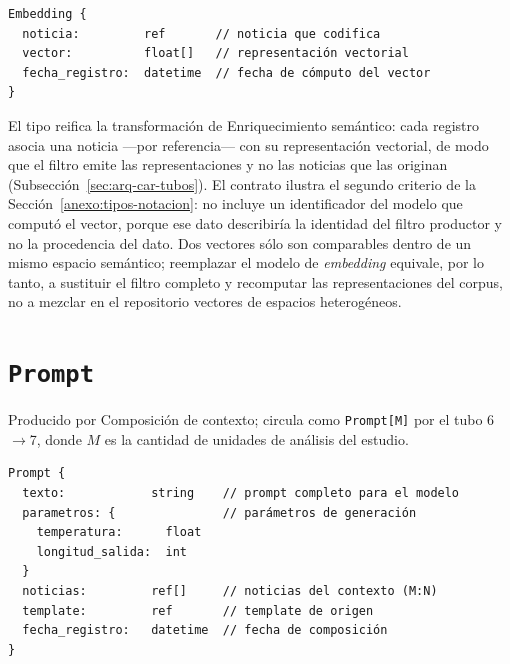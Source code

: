 \documentclass[12pt]{report}
\begin{document}
\noindent\begin{minipage}{\linewidth}
  \begin{lstlisting}[style=tipoanexo]
Embedding {
  noticia:         ref       // noticia que codifica
  vector:          float[]   // representación vectorial
  fecha_registro:  datetime  // fecha de cómputo del vector
}
\end{lstlisting}
\end{minipage}

El tipo reifica la transformación de Enriquecimiento semántico: cada registro asocia una noticia ---por referencia--- con su representación vectorial, de modo que el filtro emite las representaciones y no las noticias que las originan (Subsección~\ref{sec:arq-car-tubos}). El contrato ilustra el segundo criterio de la Sección~\ref{anexo:tipos-notacion}: no incluye un identificador del modelo que computó el vector, porque ese dato describiría la identidad del filtro productor y no la procedencia del dato. Dos vectores sólo son comparables dentro de un mismo espacio semántico; reemplazar el modelo de \textit{embedding} equivale, por lo tanto, a sustituir el filtro completo y recomputar las representaciones del corpus, no a mezclar en el repositorio vectores de espacios heterogéneos.

\section{\texorpdfstring{\texttt{Prompt}}{Prompt}}
\label{anexo:tipo-prompt}

Producido por Composición de contexto; circula como \texttt{Prompt[M]} por el tubo 6\(\to\)7, donde \(M\) es la cantidad de unidades de análisis del estudio.

\noindent\begin{minipage}{\linewidth}
  \begin{lstlisting}[style=tipoanexo]
Prompt {
  texto:            string    // prompt completo para el modelo
  parametros: {               // parámetros de generación
    temperatura:      float
    longitud_salida:  int
  }
  noticias:         ref[]     // noticias del contexto (M:N)
  template:         ref       // template de origen
  fecha_registro:   datetime  // fecha de composición
}
\end{lstlisting}
\end{minipage}
\end{document}
